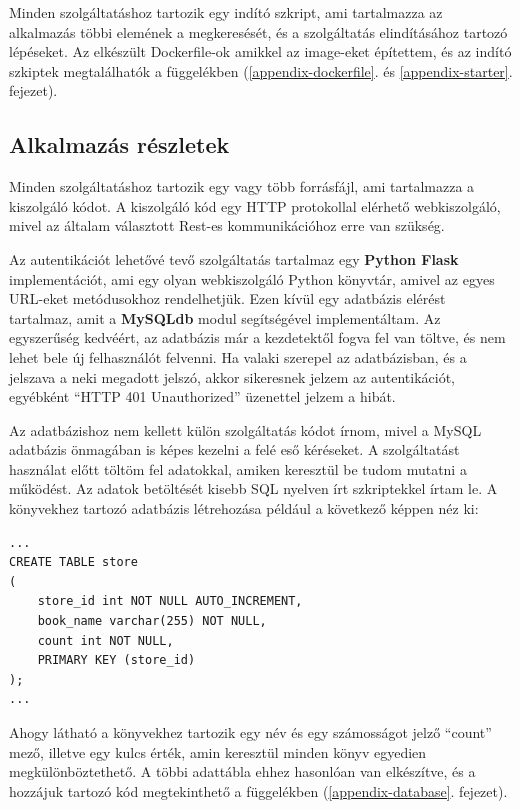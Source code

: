 \documentclass[11pt,magyar,a4paper,twoside,]{report}
\begin{document}
Minden szolgáltatáshoz tartozik egy indító szkript, ami tartalmazza az
alkalmazás többi elemének a megkeresését, és a szolgáltatás
elindításához tartozó lépéseket. Az elkészült Dockerfile-ok amikkel az
image-eket építettem, és az indító szkiptek megtalálhatók a függelékben
(\ref{appendix-dockerfile}. és \ref{appendix-starter}. fejezet).

\subsection{Alkalmazás részletek}\label{alkalmazuxe1s-ruxe9szletek}

Minden szolgáltatáshoz tartozik egy vagy több forrásfájl, ami
tartalmazza a kiszolgáló kódot. A kiszolgáló kód egy HTTP protokollal
elérhető webkiszolgáló, mivel az általam választott Rest-es
kommunikációhoz erre van szükség.

Az autentikációt lehetővé tevő szolgáltatás tartalmaz egy \textbf{Python
Flask} implementációt, ami egy olyan webkiszolgáló Python könyvtár,
amivel az egyes URL-eket metódusokhoz rendelhetjük. Ezen kívül egy
adatbázis elérést tartalmaz, amit a \textbf{MySQLdb} modul segítségével
implementáltam. Az egyszerűség kedvéért, az adatbázis már a kezdetektől
fogva fel van töltve, és nem lehet bele új felhasználót felvenni. Ha
valaki szerepel az adatbázisban, és a jelszava a neki megadott jelszó,
akkor sikeresnek jelzem az autentikációt, egyébként ``HTTP 401
Unauthorized'' üzenettel jelzem a hibát.

Az adatbázishoz nem kellett külön szolgáltatás kódot írnom, mivel a
MySQL adatbázis önmagában is képes kezelni a felé eső kéréseket. A
szolgáltatást használat előtt töltöm fel adatokkal, amiken keresztül be
tudom mutatni a működést. Az adatok betöltését kisebb SQL nyelven írt
szkriptekkel írtam le. A könyvekhez tartozó adatbázis létrehozása
például a következő képpen néz ki:

\begin{verbatim}
...
CREATE TABLE store
(
    store_id int NOT NULL AUTO_INCREMENT,
    book_name varchar(255) NOT NULL,
    count int NOT NULL,
    PRIMARY KEY (store_id)
);
...
\end{verbatim}

Ahogy látható a könyvekhez tartozik egy név és egy számosságot jelző
``count'' mező, illetve egy kulcs érték, amin keresztül minden könyv
egyedien megkülönböztethető. A többi adattábla ehhez hasonlóan van
elkészítve, és a hozzájuk tartozó kód megtekinthető a függelékben
(\ref{appendix-database}. fejezet).
\end{document}
